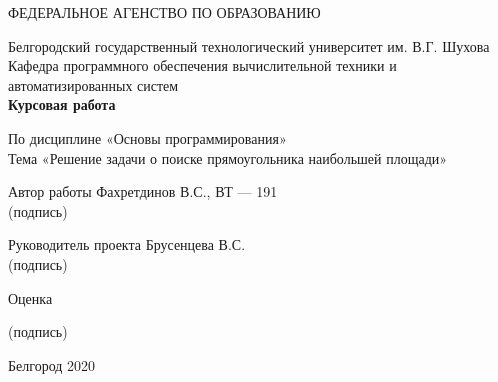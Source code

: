 \documentclass[a4paper,12pt]{article}
\begin{document}
\begin{center}
\large{ФЕДЕРАЛЬНОЕ АГЕНСТВО ПО ОБРАЗОВАНИЮ\\}

\normalsize{Белгородский государственный технологический университет им. В.Г. Шухова}\\
\hfill \break
\normalsize{Кафедра программного обеспечения вычислительной техники и автоматизированных систем}\\
\hfill\break
\hfill \break
\hfill \break
\large{\textbf{Курсовая работа}}\\
\begin{center}
\normalsize{По дисциплине «Основы программирования»}\\
\normalsize{Тема «Решение задачи о поиске прямоугольника наибольшей площади»}
\end{center}
\hfill \break
\hfill \break
\hfill \break
\begin{flushleft}
\normalsize{Автор работы }
\underline{\hspace{2cm}}\hspace{1cm}
Фахретдинов В.С., ВТ — 191\\
\hspace{3cm}
\tiny{ (подпись) \textcolor{white}{\hspace{4.2cm}}}

\end{flushleft}
\begin{flushleft}
\normalsize{Руководитель проекта }
\underline{\hspace{2cm}}\hspace{1cm}
Брусенцева В.С.\\
\hspace{4.5cm}
\tiny{ (подпись) \textcolor{white}{\hspace{4.2cm}}}\\
\begin{flushleft}
\normalsize{Оценка }
\underline{\hspace{3cm}}\hspace{1cm}

\tiny{ (подпись) \textcolor{white}{\hspace{4.2cm}}}

\end{flushleft}

\end{flushleft}
\hfill \break
\hfill \break
\hfill \break

Белгород
2020
\end{center}
\newpage
\thispagestyle{empty} %
\tableofcontents
\newpage
\end{document}
